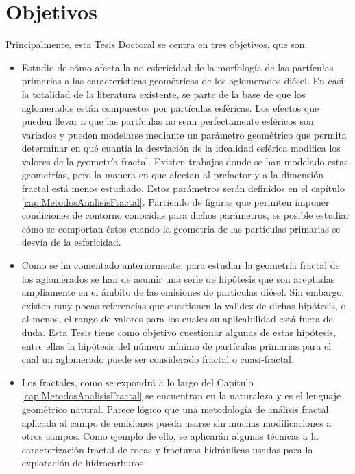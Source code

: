 \section{Objetivos}\label{sec:Objetivos}

\par Principalmente, esta Tesis Doctoral se centra en tres objetivos, que son:

\begin{itemize}
	
	\item Estudio de cómo afecta la no esfericidad de la morfología de las partículas primarias a las características geométricas de los aglomerados diésel. En casi la totalidad de la literatura existente, se parte de la base de que los aglomerados están compuestos por partículas esféricas. Los efectos que pueden llevar a que las partículas no sean perfectamente esféricos son variados y pueden modelarse mediante un parámetro geométrico que permita determinar en qué cuantía la desviación de la idealidad esférica modifica los valores de la geometría fractal. Existen trabajos donde se han modelado estas geometrías, pero la manera en que afectan al prefactor y a la dimensión fractal está menos estudiado. Estos parámetros serán definidos en el capítulo \ref{cap:MetodosAnalisisFractal}. Partiendo de figuras que permiten imponer condiciones de contorno conocidas para dichos parámetros, es posible estudiar cómo se comportan éstos cuando la geometría de las partículas primarias se desvía de la esfericidad.
	
	\item Como se ha comentado anteriormente, para estudiar la geometría fractal de los aglomerados se han de asumir una serie de hipótesis que son aceptadas ampliamente en el ámbito de las emisiones de partículas diésel. Sin embargo, existen muy pocas referencias que cuestionen la validez de dichas hipótesis, o al menos, el rango de valores para los cuales su aplicabilidad está fuera de duda. Esta Tesis tiene como objetivo cuestionar algunas de estas hipótesis, entre ellas la hipótesis del número mínimo de partículas primarias para el cual un aglomerado puede ser considerado fractal o cuasi-fractal.
	
	\item Los fractales, como se expondrá a lo largo del Capítulo \ref{cap:MetodosAnalisisFractal} se encuentran en la naturaleza y es el lenguaje geométrico natural. Parece lógico que una metodología de análisis fractal aplicada al campo de emisiones pueda usarse sin muchas modificaciones a otros campos. Como ejemplo de ello, se aplicarán algunas técnicas a la caracterización fractal de rocas y fracturas hidráulicas usadas para la explotación de hidrocarburos.
	

\end{itemize}
